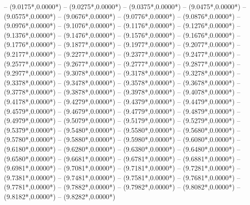 {	-- ({9.0175*\dx},{0.0000*\dy})
	-- ({9.0275*\dx},{0.0000*\dy})
	-- ({9.0375*\dx},{0.0000*\dy})
	-- ({9.0475*\dx},{0.0000*\dy})
	-- ({9.0575*\dx},{0.0000*\dy})
	-- ({9.0676*\dx},{0.0000*\dy})
	-- ({9.0776*\dx},{0.0000*\dy})
	-- ({9.0876*\dx},{0.0000*\dy})
	-- ({9.0976*\dx},{0.0000*\dy})
	-- ({9.1076*\dx},{0.0000*\dy})
	-- ({9.1176*\dx},{0.0000*\dy})
	-- ({9.1276*\dx},{0.0000*\dy})
	-- ({9.1376*\dx},{0.0000*\dy})
	-- ({9.1476*\dx},{0.0000*\dy})
	-- ({9.1576*\dx},{0.0000*\dy})
	-- ({9.1676*\dx},{0.0000*\dy})
	-- ({9.1776*\dx},{0.0000*\dy})
	-- ({9.1877*\dx},{0.0000*\dy})
	-- ({9.1977*\dx},{0.0000*\dy})
	-- ({9.2077*\dx},{0.0000*\dy})
	-- ({9.2177*\dx},{0.0000*\dy})
	-- ({9.2277*\dx},{0.0000*\dy})
	-- ({9.2377*\dx},{0.0000*\dy})
	-- ({9.2477*\dx},{0.0000*\dy})
	-- ({9.2577*\dx},{0.0000*\dy})
	-- ({9.2677*\dx},{0.0000*\dy})
	-- ({9.2777*\dx},{0.0000*\dy})
	-- ({9.2877*\dx},{0.0000*\dy})
	-- ({9.2977*\dx},{0.0000*\dy})
	-- ({9.3078*\dx},{0.0000*\dy})
	-- ({9.3178*\dx},{0.0000*\dy})
	-- ({9.3278*\dx},{0.0000*\dy})
	-- ({9.3378*\dx},{0.0000*\dy})
	-- ({9.3478*\dx},{0.0000*\dy})
	-- ({9.3578*\dx},{0.0000*\dy})
	-- ({9.3678*\dx},{0.0000*\dy})
	-- ({9.3778*\dx},{0.0000*\dy})
	-- ({9.3878*\dx},{0.0000*\dy})
	-- ({9.3978*\dx},{0.0000*\dy})
	-- ({9.4078*\dx},{0.0000*\dy})
	-- ({9.4178*\dx},{0.0000*\dy})
	-- ({9.4279*\dx},{0.0000*\dy})
	-- ({9.4379*\dx},{0.0000*\dy})
	-- ({9.4479*\dx},{0.0000*\dy})
	-- ({9.4579*\dx},{0.0000*\dy})
	-- ({9.4679*\dx},{0.0000*\dy})
	-- ({9.4779*\dx},{0.0000*\dy})
	-- ({9.4879*\dx},{0.0000*\dy})
	-- ({9.4979*\dx},{0.0000*\dy})
	-- ({9.5079*\dx},{0.0000*\dy})
	-- ({9.5179*\dx},{0.0000*\dy})
	-- ({9.5279*\dx},{0.0000*\dy})
	-- ({9.5379*\dx},{0.0000*\dy})
	-- ({9.5480*\dx},{0.0000*\dy})
	-- ({9.5580*\dx},{0.0000*\dy})
	-- ({9.5680*\dx},{0.0000*\dy})
	-- ({9.5780*\dx},{0.0000*\dy})
	-- ({9.5880*\dx},{0.0000*\dy})
	-- ({9.5980*\dx},{0.0000*\dy})
	-- ({9.6080*\dx},{0.0000*\dy})
	-- ({9.6180*\dx},{0.0000*\dy})
	-- ({9.6280*\dx},{0.0000*\dy})
	-- ({9.6380*\dx},{0.0000*\dy})
	-- ({9.6480*\dx},{0.0000*\dy})
	-- ({9.6580*\dx},{0.0000*\dy})
	-- ({9.6681*\dx},{0.0000*\dy})
	-- ({9.6781*\dx},{0.0000*\dy})
	-- ({9.6881*\dx},{0.0000*\dy})
	-- ({9.6981*\dx},{0.0000*\dy})
	-- ({9.7081*\dx},{0.0000*\dy})
	-- ({9.7181*\dx},{0.0000*\dy})
	-- ({9.7281*\dx},{0.0000*\dy})
	-- ({9.7381*\dx},{0.0000*\dy})
	-- ({9.7481*\dx},{0.0000*\dy})
	-- ({9.7581*\dx},{0.0000*\dy})
	-- ({9.7681*\dx},{0.0000*\dy})
	-- ({9.7781*\dx},{0.0000*\dy})
	-- ({9.7882*\dx},{0.0000*\dy})
	-- ({9.7982*\dx},{0.0000*\dy})
	-- ({9.8082*\dx},{0.0000*\dy})
	-- ({9.8182*\dx},{0.0000*\dy})
	-- ({9.8282*\dx},{0.0000*\dy})
}
